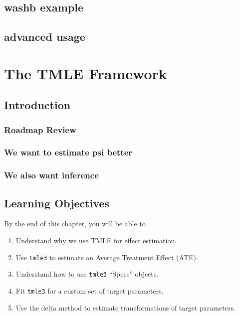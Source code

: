 \documentclass[
  12pt, krantz2,
]{krantz}
\newcommand{\passthrough}[1]{#1}
\providecommand{\tightlist}{%
  \setlength{\itemsep}{0pt}\setlength{\parskip}{0pt}}
\theoremstyle{definition}
\theoremstyle{definition}
\theoremstyle{definition}
\newcommand{\1}{\mathbbm{1}}
\begin{document}
\hypertarget{washb-example-1}{%
\section{washb example}\label{washb-example-1}}

\hypertarget{advanced-usage-1}{%
\section{advanced usage}\label{advanced-usage-1}}

\hypertarget{tmle3}{%
\chapter{The TMLE Framework}\label{tmle3}}

\hypertarget{introduction-3}{%
\section{Introduction}\label{introduction-3}}

\hypertarget{roadmap-review-2}{%
\subsection{Roadmap Review}\label{roadmap-review-2}}

\hypertarget{we-want-to-estimate-psi-better}{%
\subsection{We want to estimate psi better}\label{we-want-to-estimate-psi-better}}

\hypertarget{we-also-want-inference}{%
\subsection{We also want inference}\label{we-also-want-inference}}

\hypertarget{learn-tmle}{%
\section{Learning Objectives}\label{learn-tmle}}

By the end of this chapter, you will be able to

\begin{enumerate}
\def\labelenumi{\arabic{enumi}.}
\tightlist
\item
  Understand why we use TMLE for effect estimation.
\item
  Use \passthrough{\lstinline!tmle3!} to estimate an Average Treatment Effect (ATE).
\item
  Understand how to use \passthrough{\lstinline!tmle3!} ``Specs'' objects.
\item
  Fit \passthrough{\lstinline!tmle3!} for a custom set of target parameters.
\item
  Use the delta method to estimate transformations of target parameters.
\end{enumerate}
\end{document}
